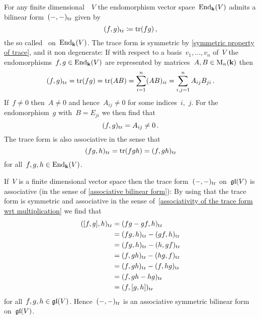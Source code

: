 \begin{recall}
  \label{recalling the trace form}
  For any finite dimensional~{\vectorspace{$\kf$}}~$V$ the endomorphism vector space~$\operatorname{End}_{\mathbf{k}}(V)$ admits a bilinear form~$(-,-)_{\operatorname{tr}}$ given by
  \[
    (f,g)_{\operatorname{tr}}
    \coloneqq
    \operatorname{tr}(fg) \,,
  \]
  the so called~ on~$\operatorname{End}_{\mathbf{k}}(V)$.
  The trace form is symmetric by \cref{symmetric property of trace}, and it non degenerate:
  If with respect to a basis~$v_1, \dotsc, v_n$ of~$V$ the endomorphisms~$f, g \in \operatorname{End}_{\mathbf{k}}(V)$ are represented by matrices~$A, B \in \operatorname{M}_n(\mathbf{k})$ then
  \[
    (f,g)_{\operatorname{tr}}
    =
    \operatorname{tr}(fg)
    =
    \operatorname{tr}(AB)
    =
    \sum_{i=1}^n (AB)_{ii}
    =
    \sum_{i,j=1}^n
    A_{ij} B_{ji} \,.
  \]
  If~$f \neq 0$ then~$A \neq 0$ and hence~$A_{ij} \neq 0$ for some indices~$i$,~$j$.
  For the endomorphism~$g$ with~$B = E_{ji}$ we then find that
  \[
    (f,g)_{\operatorname{tr}}
    =
    A_{ij}
    \neq
    0 \,.
  \]
  The trace form is also associative in the sense that
  \begin{equation}
    \label{associativity of the trace form wrt multiplication}
    (fg, h)_{\operatorname{tr}}
    =
    \operatorname{tr}(fgh)
    =
    (f, gh)_{\operatorname{tr}}
  \end{equation}
  for all~$f, g, h \in \operatorname{End}_{\mathbf{k}}(V)$.
\end{recall}


\begin{example}
  \label{trace form is symmetric and associative}
  If~$V$ is a finite dimensional vector space then the trace form~$(-,-)_{\operatorname{tr}}$ on~$\mathfrak{gl}(V)$ is associative (in the sense of \cref{associative bilinear form}):
  By using that the trace form is symmetric and associative in the sense of~\eqref{associativity of the trace form wrt multiplication} we find that
  \begin{equation}
    \label{associativity of the trace form wrt bracket}
    \begin{aligned}
      ([f,g],h)_{\operatorname{tr}}
      &=
      (fg - gf, h)_{\operatorname{tr}}
      \\
      &=
      (fg, h)_{\operatorname{tr}} - (gf,h)_{\operatorname{tr}}
      \\
      &=
      (fg, h)_{\operatorname{tr}} - (h, gf)_{\operatorname{tr}}
      \\
      &=
      (f, gh)_{\operatorname{tr}} - (hg, f)_{\operatorname{tr}}
      \\
      &=
      (f, gh)_{\operatorname{tr}} - (f, hg)_{\operatorname{tr}}
      \\
      &=
      (f, gh - hg)_{\operatorname{tr}}
      \\
      &=
      (f, [g,h])_{\operatorname{tr}}
    \end{aligned}
  \end{equation}
  for all~$f, g, h \in \mathfrak{gl}(V)$.
  Hence~$(-,-)_{\operatorname{tr}}$ is an associative symmetric bilinear form on~$\mathfrak{gl}(V)$.
\end{example}


